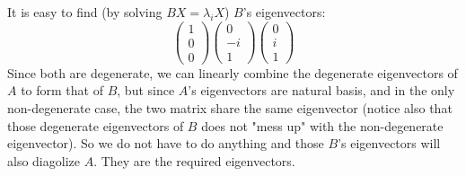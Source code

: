 \documentclass{article}
\begin{document}
It is easy to find (by solving $BX=\lambda_i X$) $B$'s eigenvectors:
$$
\begin{pmatrix}
    1\\ 0\\ 0
\end{pmatrix}
\begin{pmatrix}
    0\\ -i\\ 1
\end{pmatrix}
\begin{pmatrix}
    0\\ i\\ 1
\end{pmatrix}
$$
Since both are degenerate, we can linearly combine the degenerate
eigenvectors of $A$ to form that of $B$, but since $A$'s eigenvectors
are natural basis, and in the only non-degenerate case, the two matrix
share the same eigenvector (notice also that those degenerate
eigenvectors of $B$ does not "mess up" with the non-degenerate
eigenvector). So we do not have to do anything and those
$B$'s eigenvectors will also diagolize $A$. They are the required
eigenvectors.
\end{document}
